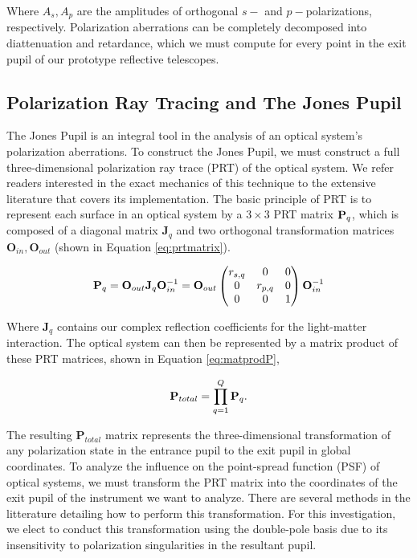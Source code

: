 Where $A_{s},A_{p}$ are the amplitudes of orthogonal $s-$ and $p-$polarizations, respectively. Polarization aberrations can be completely decomposed into diattenuation and retardance, which we must compute for every point in the exit pupil of our prototype reflective telescopes.

\subsection{Polarization Ray Tracing and The Jones Pupil}
The Jones Pupil is an integral tool in the analysis of an optical system's polarization aberrations. To construct the Jones Pupil, we must construct a full three-dimensional polarization ray trace (PRT) of the optical system. We refer readers interested in the exact mechanics of this technique to the extensive literature that covers its implementation\cite{Yun_1,Yun_2,Chipman_2018}. The basic principle of PRT is to represent each surface in an optical system by a $3\times3$ PRT matrix $\mathbf{P}_{q}$, which is composed of a diagonal matrix $\mathbf{J}_{q}$ and two orthogonal transformation matrices $\mathbf{O}_{in},\mathbf{O}_{out}$ (shown in Equation \ref{eq:prtmatrix}).

\begin{equation}
	\mathbf{P}_{q} = \mathbf{O}_{out} \mathbf{J}_{q} \mathbf{O}_{in}^{-1} = 
	\mathbf{O}_{out}
	\begin{pmatrix}
		r_{s,q} & 0 & 0 \\
		0 & r_{p,q} & 0 \\
		0 & 0 & 1 \\
	\end{pmatrix}
	\mathbf{O}_{in}^{-1}
	\label{eq:prtmatrix}
\end{equation}

Where $\mathbf{J}_{q}$ contains our complex reflection coefficients for the light-matter interaction. The optical system can then be represented by a matrix product of these PRT matrices, shown in Equation \ref{eq:matprodP},

\begin{equation}
	\mathbf{P}_{total} = \prod_{q = 1}^{Q} \mathbf{P}_{q}.
	\label{eq:matprodP}
\end{equation}

The resulting $\mathbf{P}_{total}$ matrix represents the three-dimensional transformation of any polarization state in the entrance pupil to the exit pupil in global coordinates. To analyze the influence on the point-spread function (PSF) of optical systems, we must transform the PRT matrix into the coordinates of the exit pupil of the instrument we want to analyze. There are several methods in the litterature detailing how to perform this transformation\cite{chipman}. For this investigation, we elect to conduct this transformation using the double-pole basis due to its insensitivity to polarization singularities in the resultant pupil.

